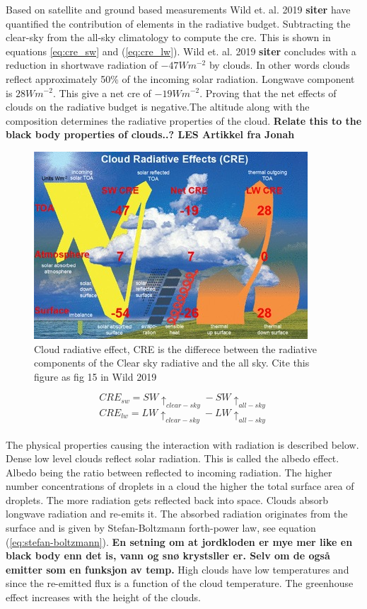 Based on satellite and ground based measurements Wild et. al. 2019 \textbf{siter} have quantified the contribution of elements in the radiative budget. Subtracting the clear-sky from the all-sky climatology to compute the \acrfull{cre}. This is shown in equations \eqref{eq:cre_sw} and (\ref{eq:cre_lw}). Wild et. al. 2019 \textbf{siter} concludes with a reduction in shortwave radiation of $-47Wm^{-2}$ by clouds. In other words clouds reflect approximately 50\% of the incoming solar radiation. Longwave component is $28Wm^{-2}$. This give a net \acrshort{cre} of $-19Wm^{-2}$. Proving that the net effects of clouds on the radiative budget is negative.The altitude along with the composition determines the radiative properties of the cloud. \textbf{Relate this to the black body properties of clouds..? LES Artikkel fra Jonah}
\begin{figure}[h]
    \centering
    \includegraphics[scale = 7]{Chapter1_Intro/images/CRE_wild2019.jpg}
    \caption{Cloud radiative effect, CRE is the differece between the radiative components of the Clear sky radiative and the all sky. Cite this figure as fig 15 in Wild 2019}
    \label{fig:cre}
\end{figure}

\begin{equation} \label{eq:cre_sw}
    CRE_{sw} = SW\uparrow_{clear-sky} - SW\uparrow_{all-sky}
\end{equation}
\begin{equation} \label{eq:cre_lw}
    CRE_{lw} = LW\uparrow_{clear-sky} - LW\uparrow_{all-sky}
\end{equation}
\\
The physical properties causing the interaction with radiation is described below. Dense low level clouds reflect solar radiation. This is called the albedo effect. Albedo being the ratio between reflected to incoming radiation. The higher number concentrations of droplets in a cloud the higher the total surface area of droplets. The more radiation gets reflected back into space. Clouds absorb longwave radiation and re-emits it. The absorbed radiation originates from the surface and is given by Stefan-Boltzmann forth-power law, see equation (\ref{eq:stefan-boltzmann}). \textbf{En setning om at jordkloden er mye mer like en black body enn det is, vann og snø krystsller er. Selv om de også emitter som en funksjon av temp. } High clouds have low temperatures and since the re-emitted flux is a function of the cloud temperature. The greenhouse effect increases with the height of the clouds.

